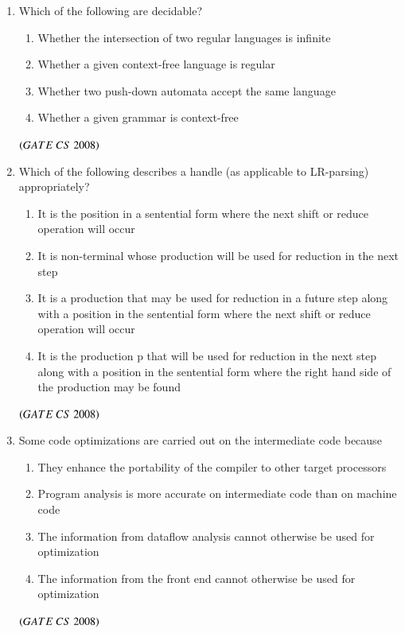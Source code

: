 \documentclass[journal]{IEEEtran}
\numberwithin{equation}{enumi}
\numberwithin{figure}{enumi}
\begin{document}
\begin{enumerate}
\item Which of the following are decidable? 
\begin{enumerate} 
    \item Whether the intersection of two regular languages is infinite  
    \item Whether a given context-free language is regular  
    \item  Whether two push-down automata accept the same language 
    \item Whether a given grammar is context-free 
\end{enumerate}
\begin{enumerate}
\end{enumerate}
\hfill $\left(GATE\ CS\  2008\right)$

\item Which of the following describes a handle (as applicable to LR-parsing) 
appropriately? 
\begin{enumerate}
    \item It is the position in a sentential form where the next shift or reduce operation will occur
    \item It is non-terminal whose production will be used for reduction in the next step 
    \item It is a production that may be used for reduction in a future step along with a position in the sentential form where the next shift or reduce operation will occur
    \item It is the production p that will be used for reduction in the next step along with a position in the sentential form where the right hand side of the production may be found 
\end{enumerate}
\hfill $\left(GATE\ CS\  2008\right)$

\item Some code optimizations are carried out on the intermediate code because 
   \begin{enumerate}
   \item They enhance the portability of the compiler to other target processors 
   \item Program analysis is more accurate on intermediate code than on machine code
   \item The information from dataflow analysis cannot otherwise be used for optimization
   \item The information from the front end cannot otherwise be used for optimization
\end{enumerate}
\hfill $\left(GATE\ CS\  2008\right)$


\end{enumerate}
\end{document}

